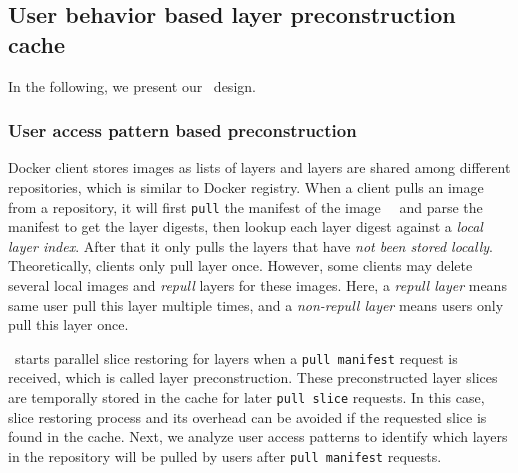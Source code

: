 
\subsection{User behavior based layer preconstruction cache}
\label{sec:cache-design}

In the following, we present our \sysname~\preconstructcachename design.




\subsubsection{User access pattern based preconstruction}

Docker client stores images as lists of layers and layers are shared among different repositories, 
which is similar to Docker registry.
When a client pulls an image from a repository, 
it will first \texttt{pull} the manifest of the image~\cite{docker}~\cite{dockerworkload} and 
parse the manifest to get the layer digests,
then lookup each layer digest against a \emph{local layer index}.
After that it only pulls the layers that have \emph{not been stored locally}.
Theoretically, clients only pull layer once. 
However, some clients may delete several local images and \emph{repull} layers for these images.
Here, a \emph{repull layer} means same user pull this layer multiple times,
and a \emph{non-repull layer} means users only pull this layer once.

\preconstructcachename~starts parallel slice restoring for layers 
when a \texttt{pull manifest} request is received, 
which is called layer preconstruction.
These preconstructed layer slices are temporally stored in the cache for later \texttt{pull slice} requests.
In this case, slice restoring process and its overhead can be avoided if the requested slice is found in the cache.
Next, we analyze user access patterns to identify which layers in the repository will be pulled by users after 
\texttt{pull manifest} requests.

